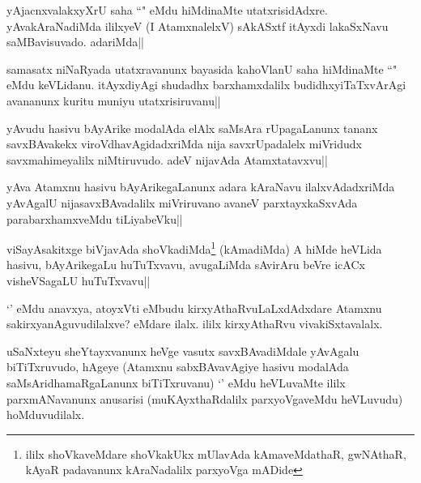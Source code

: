\begin{artha}
yAjacnxvalakxyXrU saha ``\stext " eMdu hiMdinaMte utatxrisidAdxre. yAvakAraNadiMda ililxyeV (I AtamxnalelxV) sAkASxtf itAyxdi lakaSxNavu saMBavisuvado. adariMda||
\end{artha}

\stext

\begin{artha}%
samasatx niNaRyada utatxravanunx bayasida kahoVlanU saha hiMdinaMte ``\stext" eMdu keVLidanu. \stext itAyxdiyAgi shudadhx barxhamxdalilx budidhxyiTaTxvArAgi avananunx kuritu muniyu utatxrisiruvanu||
\end{artha}


\begin{artha}
yAvudu hasivu bAyArike modalAda elAlx saMsAra rUpagaLanunx tananx savxBAvakekx viroVdhavAgidadxriMda nija savxrUpadalelx miVridudx savxmahimeyalilx niMtiruvudo. adeV nijavAda Atamxtatavxvu||
\end{artha}


\begin{artha}
yAva Atamxnu hasivu bAyArikegaLanunx adara kAraNavu ilalxvAdadxriMda yAvAgalU nijasavxBAvadalilx miVriruvano avaneV parxtayxkaSxvAda parabarxhamxveMdu tiLiyabeVku||
\end{artha}

\begin{artha}
viSayAsakitxge biVjavAda shoVkadiMda\footnote[1]{ililx shoVkaveMdare shoVkakUkx mUlavAda kAmaveMdathaR, gwNAthaR, kAyaR padavanunx kAraNadalilx parxyoVga mADide} (kAmadiMda) A hiMde heVLida hasivu, bAyArikegaLu huTuTxvavu, avugaLiMda sAvirAru beVre icACx visheVSagaLU huTuTxvavu||
\end{artha}


\begin{artha}
`\stext ' eMdu anavxya, atoyxVti eMbudu kirxyAthaRvuLaLxdAdxdare Atamxnu sakirxyanAguvudilalxve? eMdare ilalx. ililx kirxyAthaRvu vivakiSxtavalalx. 
\end{artha}


\begin{artha}
uSaNxteyu sheYtayxvanunx heVge vasutx savxBAvadiMdale yAvAgalu biTiTxruvudo, hAgeye (Atamxnu sabxBAvavAgiye hasivu modalAda saMsAridhamaRgaLanunx biTiTxruvanu) `\stext ' eMdu heVLuvaMte ililx parxmANavanunx anusarisi (muKAyxthaRdalilx parxyoVgaveMdu heVLuvudu) hoMduvudilalx. 
\end{artha}

